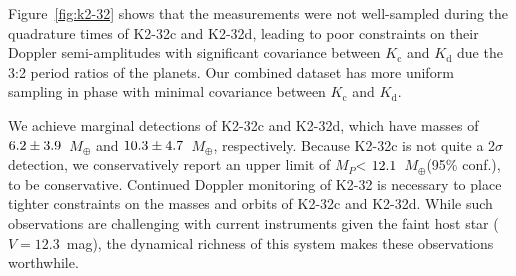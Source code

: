 \documentclass[preprint2]{aastex6}
\newcommand{\Mp}{\ensuremath{M_{P}}\xspace}
\newcommand{\Me}{\ensuremath{M_{\oplus}}\xspace}
\newcommand{\K}[1]{\ensuremath{K_\mathrm{#1}}\xspace}
\begin{document}
Figure~\ref{fig:k2-32} shows that the \cite{Dai16} measurements were not well-sampled during the quadrature times of K2-32c and K2-32d, leading to poor constraints on their Doppler semi-amplitudes with significant covariance between \K{c} and \K{d} due the 3:2 period ratios of the planets. Our combined dataset has more uniform sampling in phase with minimal covariance between \K{c} and \K{d}.

We achieve marginal detections of K2-32c and K2-32d, which have masses of $\val{K2-32-circ}{Mpsini2}$~\Me and $\val{K2-32-circ}{Mpsini3}$~\Me, respectively. Because K2-32c is not quite a 2$\sigma$ detection, we conservatively report an upper limit of \Mp < $\val{K2-32-circ}{Mpsiniul2}$~\Me (95\% conf.), to be conservative. Continued Doppler monitoring of K2-32 is necessary to place tighter constraints on the masses and orbits of K2-32c and K2-32d. While such observations are challenging with current instruments given the faint host star ($V = 12.3$~mag), the dynamical richness of this system makes these observations worthwhile.

\begin{figure*}
\caption{Three-planet Keplerian fit to the K2-32 radial velocities (RVs), assuming circular orbits (see Section~\ref{ssec:k2-32}). {\bf a)} Time series of RVs from HIRES along with HARPS and PFS published in \cite{Dai16}. During the fitting, we allowed for an arbitrary offset between the three instruments to float as a free parameter. The blue line shows the most probable Keplerian model. {\bf b)} Residuals to the most probable Keplerian model. Panels {\bf c)} through {\bf e)} show the phase-folded RVs and the most probable Keplerian with the contributions from the other planets removed. The large red circles show the phase-binned RVs \label{fig:k2-32}.}
\end{figure*}
\end{document}
